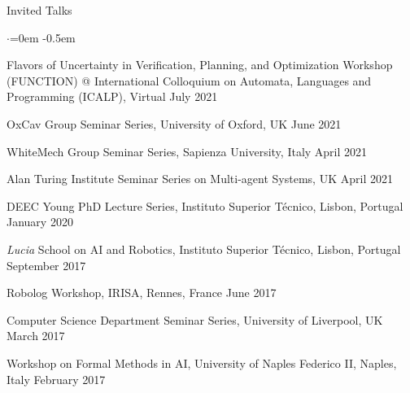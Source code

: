 
\begin{rSection}{Invited Talks}
 \begin{list}{$\cdot$}{\leftmargin=0em} %
   \itemsep -0.5em \vspace{-0.5em} %
   \item Flavors of Uncertainty in Verification, Planning, and Optimization  Workshop \\ (FUNCTION) @ International Colloquium on Automata, Languages
and \\ Programming (ICALP), Virtual \hfill July 2021
   \item OxCav Group Seminar Series, University of Oxford, UK \hfill June 2021
   \item WhiteMech  Group Seminar Series, Sapienza University, Italy \hfill April 2021
\item Alan Turing Institute Seminar Series on Multi-agent Systems, UK \hfill April 2021   
   \item DEEC Young PhD   Lecture Series, Instituto Superior T\'{e}cnico, Lisbon, Portugal \hfill January 2020
\item  \emph{Lucia}  School on AI and Robotics, Instituto Superior T\'{e}cnico, Lisbon, Portugal \hfill September 2017
\item  Robolog Workshop, IRISA, Rennes, France \hfill June 2017
\item Computer Science Department Seminar Series, University of Liverpool, UK \hfill March 2017
\item Workshop on Formal Methods in AI, University of Naples Federico II, Naples, Italy \hfill February 2017 
  \end{list}


\end{rSection}
